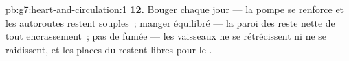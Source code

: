 \begin{solution}{pb:g7:heart-and-circulation:1}
\textbf{12.} Bouger chaque jour --- la pompe se renforce et les
autoroutes restent souples~; manger équilibré --- la paroi des
 reste nette de tout encrassement~; pas de fumée --- les
vaisseaux ne se rétrécissent ni ne se raidissent, et les places du
 restent libres pour le .
\end{solution}
